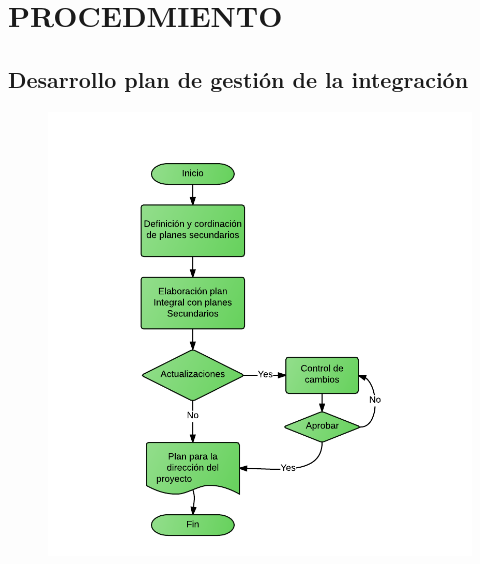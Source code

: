 \chapter{PROCEDMIENTO}
%
\section{Desarrollo plan de gesti\'on de la integraci\'on}
%
\begin{figure}[H]
    \centering
    \includegraphics[width=1\textwidth]{images/DF-AC01.png}
\end{figure}
%
